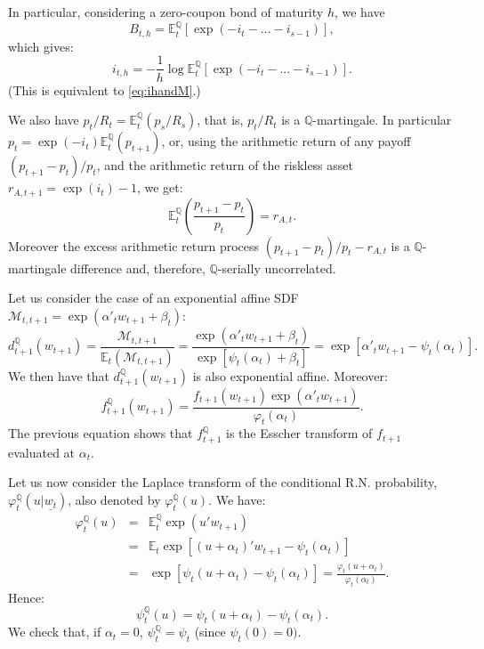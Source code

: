 \documentclass[
  12pt,
]{book}
\theoremstyle{definition}
\theoremstyle{definition}
\theoremstyle{definition}
\theoremstyle{definition}
\theoremstyle{remark}
\begin{document}
In particular, considering a zero-coupon bond of maturity \(h\), we have
\[
B_{t,h} = \mathbb{E}^{\mathbb{Q}}_t[\exp(-i_{t}-...-i_{s-1})],
\]
which gives:
\begin{equation}
\boxed{i_{t,h}=-\frac{1}{h}\log \mathbb{E}^{\mathbb{Q}}_t[\exp(-i_{t}-...-i_{s-1})].}\label{eq:ihandMQ}
\end{equation}
(This is equivalent to \eqref{eq:ihandM}.)

We also have \(p_t/R_t = \mathbb{E}^{\mathbb{Q}}_t\left( p_s/R_s\right)\), that is, \(p_t/R_t\) is a \(\mathbb{Q}\)-martingale. In particular \(p_t = \exp(-i_{t})\mathbb{E}^{\mathbb{Q}}_t(p_{t+1})\), or, using the arithmetic return of any payoff \((p_{t+1}-p_t)/p_t\), and the arithmetic return of the riskless asset \(r_{A,t+1}=\exp(i_{t})-1\), we get:
\[
\mathbb{E}^{\mathbb{Q}}_t\left(\frac{p_{t+1}-p_t}{p_t}\right)=r_{A,t}.
\]
Moreover the excess arithmetic return process \((p_{t+1}-p_t)/p_t-r_{A,t}\) is a \(\mathbb{Q}\)-martingale difference and, therefore, \(\mathbb{Q}\)-serially uncorrelated.

Let us consider the case of an exponential affine SDF \(\mathcal{M}_{t,t+1}=\exp(\alpha'_t w_{t+1}+\beta_t)\):
\[
d^{\mathbb{Q}}_{t+1}(w_{t+1}) = \frac{\mathcal{M}_{t,t+1}}{\mathbb{E}_t(\mathcal{M}_{t,t+1})} = \frac{\exp(\alpha'_t
w_{t+1}+\beta_t)}{\exp[\psi_t(\alpha_t)+\beta_t]} = \exp[\alpha'_t w_{t+1}-\psi_t(\alpha_t)].
\]
We then have that \(d^{\mathbb{Q}}_{t+1}(w_{t+1})\) is also exponential affine. Moreover:
\[
f^{\mathbb{Q}}_{t+1} (w_{t+1}) = \frac{f_{t+1} (w_{t+1}) \exp (\alpha'_t w_{t+1})}{\varphi_t (\alpha_t)}.
\]
The previous equation shows that \(f^{\mathbb{Q}}_{t+1}\) is the Esscher transform of \(f_{t+1}\) evaluated at \(\alpha_t\).

Let us now consider the Laplace transform of the conditional R.N. probability, \(\varphi^{\mathbb{Q}}_t(u|\underline{w_t})\), also denoted by \(\varphi^{\mathbb{Q}}_t(u)\). We have:
\begin{eqnarray*}
\varphi^{\mathbb{Q}}_t(u) &=& \mathbb{E}^{\mathbb{Q}}_t \exp(u' w_{t+1}) \\
&=& \mathbb{E}_t \exp[(u+\alpha_t)'w_{t+1}-\psi_t(\alpha_t)] \\
&=& \exp[\psi_t(u+\alpha_t)-\psi_t(\alpha_t)] =
\frac{\varphi_t(u+\alpha_t)}{\varphi_t(\alpha_t)}.
\end{eqnarray*}
Hence:
\begin{equation}
\boxed{\psi^{\mathbb{Q}}_t(u) = \psi_t(u+\alpha_t)-\psi_t(\alpha_t).}\label{eq:transfoPQ}
\end{equation}
We check that, if \(\alpha_t=0\), \(\psi^{\mathbb{Q}}_t=\psi_t\) (since \(\psi_t(0)=0)\).
\end{document}
